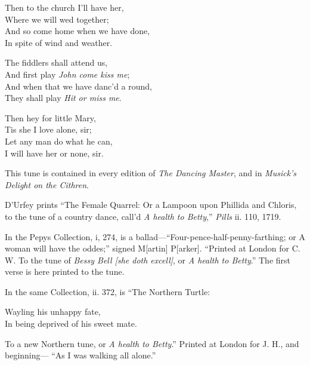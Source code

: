 \begin{dcverse}
\begin{altverse}
Then to the church I’ll have her,\\
Where we will wed together;\\
And so come home when we have done,\\
In spite of wind and weather.
\end{altverse}

\begin{altverse}
The fiddlers shall attend us,\\
And first play \textit{John come kiss me};\\
And when that we have danc’d a round,\\
They shall play \textit{Hit or miss me}.
\end{altverse}

\begin{altverse}
Then hey for little Mary,\\
Tis she I love alone, sir;\\
Let any man do what he can,\\
I will have her or none, sir.
\end{altverse}
\end{dcverse}


This tune is contained in every edition of \textit{The Dancing Master}, and in \textit{Musick’s
Delight on the Cithren}.

D’Urfey prints “The Female Quarrel: Or a Lampoon upon Phillida and
Chloris, to the tune of a country dance, call’d \textit{A health to Betty},” \textit{Pills}
ii. 110, 1719.

In the Pepys Collection, i, 274, is a ballad—“Four-pence-half-penny-farthing;
or A woman will have the oddes;” signed M[artin] P[arker]. “Printed at
London for C. W. To the tune of \textit{Bessy Bell [she doth excell]}, or \textit{A health to
Betty}.” The first verse is here printed to the tune.

In the same Collection, ii. 372, is “The Northern Turtle:
\settowidth{\versewidth}{In being deprived of his sweet mate.}
\begin{scverse}
Wayling his unhappy fate,\\
In being deprived of his sweet mate.
\end{scverse}

\pagebreak

To a new Northern tune, or \textit{A health to Betty}.” Printed at London for J. H.,
and beginning— “As I was walking all alone.”

